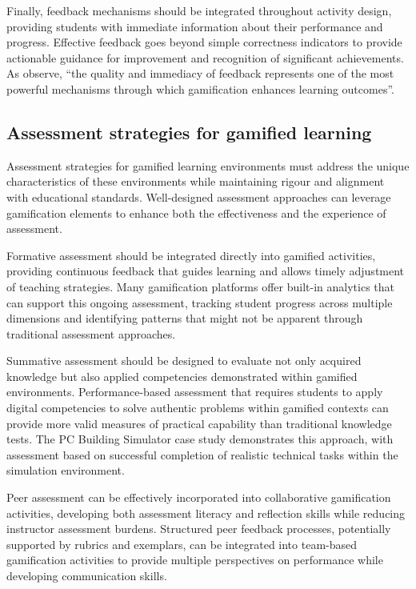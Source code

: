 \documentclass[cte]{acnsart}
\begin{document}
Finally, feedback mechanisms should be integrated throughout activity design, providing students with immediate information about their performance and progress. Effective feedback goes beyond simple correctness indicators to provide actionable guidance for improvement and recognition of significant achievements. As \citet{Mitchell2024184} observe, ``the quality and immediacy of feedback represents one of the most powerful mechanisms through which gamification enhances learning outcomes''.

\subsection{Assessment strategies for gamified learning}

Assessment strategies for gamified learning environments must address the unique characteristics of these environments while maintaining rigour and alignment with educational standards. Well-designed assessment approaches can leverage gamification elements to enhance both the effectiveness and the experience of assessment.

Formative assessment should be integrated directly into gamified activities, providing continuous feedback that guides learning and allows timely adjustment of teaching strategies. Many gamification platforms offer built-in analytics that can support this ongoing assessment, tracking student progress across multiple dimensions and identifying patterns that might not be apparent through traditional assessment approaches.

Summative assessment should be designed to evaluate not only acquired knowledge but also applied competencies demonstrated within gamified environments. Performance-based assessment that requires students to apply digital competencies to solve authentic problems within gamified contexts can provide more valid measures of practical capability than traditional knowledge tests. The PC Building Simulator case study demonstrates this approach, with assessment based on successful completion of realistic technical tasks within the simulation environment.

Peer assessment can be effectively incorporated into collaborative gamification activities, developing both assessment literacy and reflection skills while reducing instructor assessment burdens. Structured peer feedback processes, potentially supported by rubrics and exemplars, can be integrated into team-based gamification activities to provide multiple perspectives on performance while developing communication skills.
\end{document}
